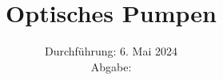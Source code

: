 

\subject{\texorpdfstring{\vspace{2ex}}{}V21\texorpdfstring{\vspace{-2ex}}{}} %
\title{Optisches Pumpen} %
\date{
	Durchführung: 6. Mai 2024 %
	\\ Abgabe:  %
}




\maketitle
\thispagestyle{empty}


\tableofcontents
\newpage








\printbibliography{}

\newpage



